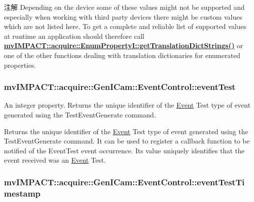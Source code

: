 \begin{DoxyNote}{注解}
Depending on the device some of these values might not be supported and especially when working with third party devices there might be custom values which are not listed here. To get a complete and reliable list of supported values at runtime an application should therefore call {\bfseries \hyperlink{classmv_i_m_p_a_c_t_1_1acquire_1_1_enum_property_i_a0ba6ccbf5ee69784d5d0b537924d26b6}{mv\+I\+M\+P\+A\+C\+T\+::acquire\+::\+Enum\+Property\+I\+::get\+Translation\+Dict\+Strings()}} or one of the other functions dealing with translation dictionaries for enumerated properties. 
\end{DoxyNote}
\hypertarget{classmv_i_m_p_a_c_t_1_1acquire_1_1_gen_i_cam_1_1_event_control_a223096bfa8b587f5da10b1a18fed4f7e}{
\subsubsection[{event\+Test}]{ mv\+I\+M\+P\+A\+C\+T\+::acquire\+::\+Gen\+I\+Cam\+::\+Event\+Control\+::event\+Test}}\label{classmv_i_m_p_a_c_t_1_1acquire_1_1_gen_i_cam_1_1_event_control_a223096bfa8b587f5da10b1a18fed4f7e}


An integer property. Returns the unique identifier of the \hyperlink{classmv_i_m_p_a_c_t_1_1acquire_1_1_event}{Event} Test type of event generated using the Test\+Event\+Generate command. 

Returns the unique identifier of the \hyperlink{classmv_i_m_p_a_c_t_1_1acquire_1_1_event}{Event} Test type of event generated using the Test\+Event\+Generate command. It can be used to register a callback function to be notified of the Event\+Test event occurrence. Its value uniquely identifies that the event received was an \hyperlink{classmv_i_m_p_a_c_t_1_1acquire_1_1_event}{Event} Test. \hypertarget{classmv_i_m_p_a_c_t_1_1acquire_1_1_gen_i_cam_1_1_event_control_af820e31dfbd429aac68f8fbe0dc2ff9f}{
\subsubsection[{event\+Test\+Timestamp}]{ mv\+I\+M\+P\+A\+C\+T\+::acquire\+::\+Gen\+I\+Cam\+::\+Event\+Control\+::event\+Test\+Timestamp}}\label{classmv_i_m_p_a_c_t_1_1acquire_1_1_gen_i_cam_1_1_event_control_af820e31dfbd429aac68f8fbe0dc2ff9f}


